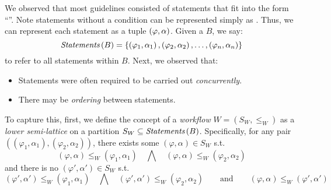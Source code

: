We observed that most guidelines consisted of statements that fit
into the form ``''. Note
statements without a condition can be represented simply as .
Thus, we can represent each statement as a tuple ${\left(\varphi, \alpha\right)}{}$.
Given a \BPG{} $B$, we say:
\begin{equation}
\textit{Statements}\left(B\right) =
\left\{\left(\varphi_1,\alpha_1\right),\left(\varphi_2,\alpha_2\right),\dots,\left(\varphi_n,\alpha_n\right)\right\}
\end{equation}
to refer to all statements within $B$. Next, we observed that:
\begin{itemize}
  \item Statements were often required to be carried out \emph{concurrently}.
  \item There may be \emph{ordering} between statements.
\end{itemize}
To capture this, first, we define the concept of a \emph{workflow}
$W = \left(S_W, \leq_W\right)$ as a \emph{lower semi-lattice} on a partition $S_W \subseteq \textit{Statements}\left(B\right)$.
Specifically, for any pair $\left(\left(\varphi_1,\alpha_1\right),
\left(\varphi_2, \alpha_2\right)\right)$, there exists some
$\left(\varphi,\alpha\right) \in S_W$ s.t.
\begin{equation}
    \left(\varphi,\alpha\right) \leq_W
    \left(\varphi_1,\alpha_1\right)\quad\bigwedge\quad
    \left(\varphi,\alpha\right) \leq_W \left(\varphi_2,\alpha_2\right)
\end{equation}
and there is no $\left(\varphi',\alpha'\right) \in S_W$ s.t.
\begin{equation}
    \left(\varphi',\alpha'\right) \leq_W
    \left(\varphi_1,\alpha_1\right)\quad\bigwedge\quad\left(\varphi',\alpha'\right) \leq_W
    \left(\varphi_2,\alpha_2\right)
  \quad\quad\text{and}\quad\quad \left(\varphi,\alpha\right) \leq_W \left(\varphi',\alpha'\right)
\end{equation}

